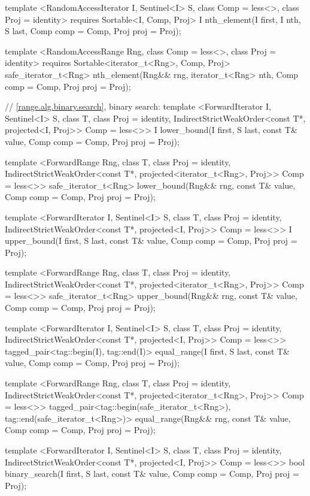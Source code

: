 {\begin{codeblock}
{{    template <RandomAccessIterator I, Sentinel<I> S, class Comp = less<>,
        class Proj = identity>
      requires Sortable<I, Comp, Proj>
      I nth_element(I first, I nth, S last, Comp comp = Comp{}, Proj proj = Proj{});

    template <RandomAccessRange Rng, class Comp = less<>, class Proj = identity>
      requires Sortable<iterator_t<Rng>, Comp, Proj>
      safe_iterator_t<Rng>
        nth_element(Rng&& rng, iterator_t<Rng> nth, Comp comp = Comp{}, Proj proj = Proj{});

    // \ref{range.alg.binary.search}, binary search:
    template <ForwardIterator I, Sentinel<I> S, class T, class Proj = identity,
        IndirectStrictWeakOrder<const T*, projected<I, Proj>> Comp = less<>>
      I lower_bound(I first, S last, const T& value, Comp comp = Comp{},
                    Proj proj = Proj{});

    template <ForwardRange Rng, class T, class Proj = identity,
        IndirectStrictWeakOrder<const T*, projected<iterator_t<Rng>, Proj>> Comp = less<>>
      safe_iterator_t<Rng>
        lower_bound(Rng&& rng, const T& value, Comp comp = Comp{}, Proj proj = Proj{});

    template <ForwardIterator I, Sentinel<I> S, class T, class Proj = identity,
        IndirectStrictWeakOrder<const T*, projected<I, Proj>> Comp = less<>>
      I upper_bound(I first, S last, const T& value, Comp comp = Comp{}, Proj proj = Proj{});

    template <ForwardRange Rng, class T, class Proj = identity,
        IndirectStrictWeakOrder<const T*, projected<iterator_t<Rng>, Proj>> Comp = less<>>
      safe_iterator_t<Rng>
        upper_bound(Rng&& rng, const T& value, Comp comp = Comp{}, Proj proj = Proj{});

    template <ForwardIterator I, Sentinel<I> S, class T, class Proj = identity,
        IndirectStrictWeakOrder<const T*, projected<I, Proj>> Comp = less<>>
      tagged_pair<tag::begin(I), tag::end(I)>
        equal_range(I first, S last, const T& value, Comp comp = Comp{}, Proj proj = Proj{});

    template <ForwardRange Rng, class T, class Proj = identity,
        IndirectStrictWeakOrder<const T*, projected<iterator_t<Rng>, Proj>> Comp = less<>>
      tagged_pair<tag::begin(safe_iterator_t<Rng>),
                  tag::end(safe_iterator_t<Rng>)>
        equal_range(Rng&& rng, const T& value, Comp comp = Comp{}, Proj proj = Proj{});

    template <ForwardIterator I, Sentinel<I> S, class T, class Proj = identity,
        IndirectStrictWeakOrder<const T*, projected<I, Proj>> Comp = less<>>
      bool binary_search(I first, S last, const T& value, Comp comp = Comp{},
                         Proj proj = Proj{});

}}
\end{codeblock}}
